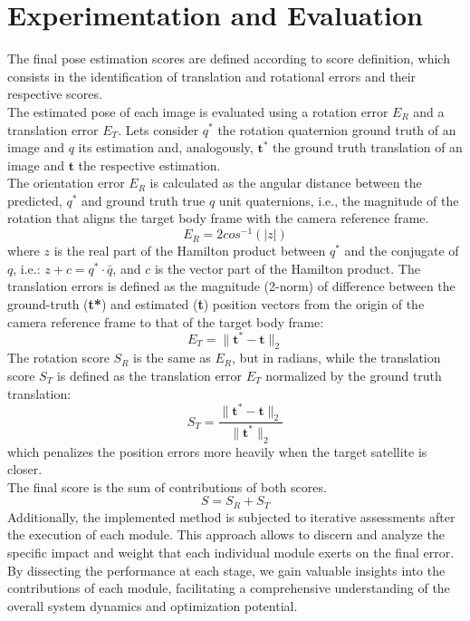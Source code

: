 \section{Experimentation and Evaluation}

The final pose estimation scores are defined according to \cite{KPEC} score definition, which consists in the identification of translation and rotational errors and their respective scores.\\
The estimated pose of each image is evaluated using a rotation error $E_R$ and a translation error $E_T$. Lets consider $q^*$ the rotation quaternion ground truth of an image and $q$ its estimation and, analogously, $\textbf{t}^*$ the ground truth translation of an image and $\textbf{t}$ the respective estimation.\\
The orientation error $E_R$ is calculated as the angular distance between the predicted, $q^*$ and ground truth true $q$ unit quaternions, i.e., the magnitude of the rotation that aligns the target body frame with the camera reference frame.
\begin{equation}
    E_R = 2cos^{-1}(|z|)
\end{equation}
where $z$ is the real part of the Hamilton product between $q^*$ and the conjugate of $q$, i.e.: \(z + c = q^*\cdot \bar{q}\), and $c$ is the vector part of the Hamilton product.
The translation errors is defined as the magnitude (2-norm) of difference between the ground-truth (\textbf{t*}) and estimated (\textbf{t}) position vectors from the origin of the camera reference frame to that of the target body frame:
\begin{equation}
    E_T = \|\textbf{t}^*-\textbf{t}\|_2
\end{equation}
The rotation score $S_R$ is the same as $E_R$, but in radians, while the translation score $S_T$ is defined as the translation error $E_T$ normalized by the ground truth translation:
\begin{equation}
    S_T = \frac{\|\textbf{t}^*-\textbf{t}\|_2}{\|\textbf{t}^*\|_2}
\end{equation}
which penalizes the position errors more heavily when the target satellite is closer.\\
The final score is the sum of contributions of both scores.
\begin{equation}
    S = S_R + S_T
\end{equation}
Additionally, the implemented method is subjected to iterative assessments after the execution of each module. This approach allows to discern and analyze the specific impact and weight that each individual module exerts on the final error. By dissecting the performance at each stage, we gain valuable insights into the contributions of each module, facilitating a comprehensive understanding of the overall system dynamics and optimization potential.

